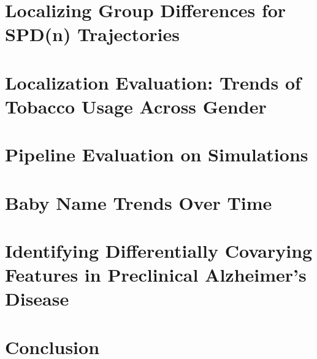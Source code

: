 \section{Localizing Group Differences for SPD(n) Trajectories}
\label{sec:loc}

\section{Localization Evaluation: Trends of Tobacco Usage Across Gender}
\label{sec:loceval}

\section{Pipeline Evaluation on Simulations}
\label{sec:pipeval}

\section{Baby Name Trends Over Time}
\label{sec:baby}

\section{Identifying Differentially Covarying Features in Preclinical Alzheimer's Disease}
\label{sec:wrap}

\section{Conclusion}

